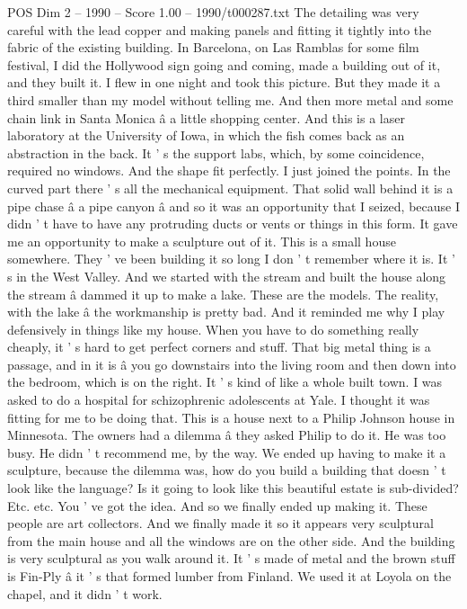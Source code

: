\begin{textsample}{POS Dim 2 – 1990 – Score 1.00 – 1990/t000287.txt}
The detailing was very careful with the lead copper and making panels and fitting it tightly into the fabric of the existing building.
In Barcelona, on Las Ramblas for some film festival, I did the Hollywood sign going and coming, made a building out of it, and they built it.
I flew in one night and took this picture.
But they made it a third smaller than my model without telling me.
And then more metal and some chain link in Santa Monica â a little shopping center.
And this is a laser laboratory at the University of Iowa, in which the fish comes back as an abstraction in the back.
It ' s the support labs, which, by some coincidence, required no windows.
And the shape fit perfectly.
I just joined the points.
In the curved part there ' s all the mechanical equipment.
That solid wall behind it is a pipe chase â a pipe canyon â and so it was an opportunity that I seized, because I didn ' t have to have any protruding ducts or vents or things in this form.
It gave me an opportunity to make a sculpture out of it.
This is a small house somewhere.
They ' ve been building it so long I don ' t remember where it is.
It ' s in the West Valley.
And we started with the stream and built the house along the stream â dammed it up to make a lake.
These are the models.
The reality, with the lake â the workmanship is pretty bad.
And it reminded me why I play defensively in things like my house.
When you have to do something really cheaply, it ' s hard to get perfect corners and stuff.
That big metal thing is a passage, and in it is â you go downstairs into the living room and then down into the bedroom, which is on the right.
It ' s kind of like a whole built town.
I was asked to do a hospital for schizophrenic adolescents at Yale.
I thought it was fitting for me to be doing that.
This is a house next to a Philip Johnson house in Minnesota.
The owners had a dilemma â they asked Philip to do it.
He was too busy.
He didn ' t recommend me, by the way.
We ended up having to make it a sculpture, because the dilemma was, how do you build a building that doesn ' t look like the language?
Is it going to look like this beautiful estate is sub-divided?
Etc. etc.
You ' ve got the idea.
And so we finally ended up making it.
These people are art collectors.
And we finally made it so it appears very sculptural from the main house and all the windows are on the other side.
And the building is very sculptural as you walk around it.
It ' s made of metal and the brown stuff is Fin-Ply â it ' s that formed lumber from Finland.
We used it at Loyola on the chapel, and it didn ' t work.

\end{textsample}

